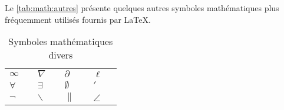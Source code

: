 Le \autoref{tab:math:autres} présente quelques autres symboles
mathématiques plus fréquemment utilisés fournis par {\LaTeX}.

\begin{table}[p]
  \caption{Symboles mathématiques divers}
  \label{tab:math:autres}
  \begin{tabularx}{1.0\linewidth}{lXlXlXlX}
    $\infty$ & \cmd{\infty} &
    $\nabla$ & \cmd{\nabla} &
    $\partial$ & \cmd{\partial} &
    $\ell$ & \cmd{\ell} \\
    $\forall$ & \cmd{\forall} &
    $\exists$ & \cmd{\exists} &
    $\emptyset$ & \cmd{\emptyset} &
    $\prime$ & \cmd{\prime} \\
    $\neg$ & \cmd{\neg} &
    $\backslash$ & \cmd{\backslash} &
    $\|$ & \cmd{\|} &
    $\angle$ & \cmd{\angle}
  \end{tabularx}
\end{table}


